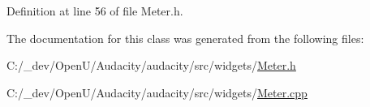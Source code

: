 Definition at line 56 of file Meter.\+h.



The documentation for this class was generated from the following files\+:\begin{DoxyCompactItemize}
\item 
C\+:/\+\_\+dev/\+Open\+U/\+Audacity/audacity/src/widgets/\hyperlink{_meter_8h}{Meter.\+h}\item 
C\+:/\+\_\+dev/\+Open\+U/\+Audacity/audacity/src/widgets/\hyperlink{_meter_8cpp}{Meter.\+cpp}\end{DoxyCompactItemize}
